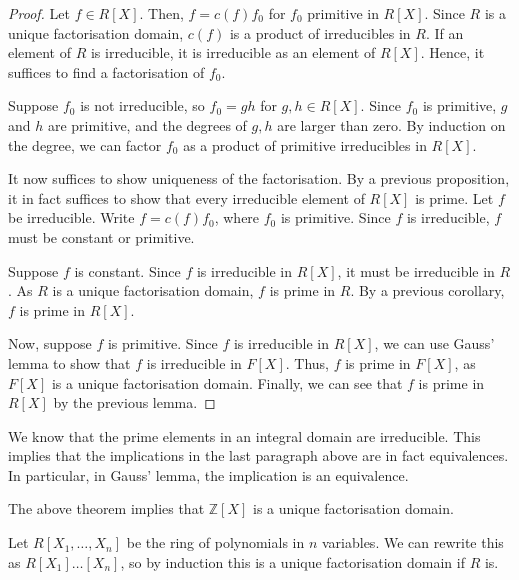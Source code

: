 \begin{proof}
	Let $f \in R[X]$.
	Then, $f = c(f) f_0$ for $f_0$ primitive in $R[X]$.
	Since $R$ is a unique factorisation domain, $c(f)$ is a product of irreducibles in $R$.
	If an element of $R$ is irreducible, it is irreducible as an element of $R[X]$.
	Hence, it suffices to find a factorisation of $f_0$.

	Suppose $f_0$ is not irreducible, so $f_0 = gh$ for $g,h \in R[X]$.
	Since $f_0$ is primitive, $g$ and $h$ are primitive, and the degrees of $g, h$ are larger than zero.
	By induction on the degree, we can factor $f_0$ as a product of primitive irreducibles in $R[X]$.

	It now suffices to show uniqueness of the factorisation.
	By a previous proposition, it in fact suffices to show that every irreducible element of $R[X]$ is prime.
	Let $f$ be irreducible.
	Write $f = c(f) f_0$, where $f_0$ is primitive.
	Since $f$ is irreducible, $f$ must be constant or primitive.

	Suppose $f$ is constant.
	Since $f$ is irreducible in $R[X]$, it must be irreducible in $R$.
	As $R$ is a unique factorisation domain, $f$ is prime in $R$.
	By a previous corollary, $f$ is prime in $R[X]$.

	Now, suppose $f$ is primitive.
	Since $f$ is irreducible in $R[X]$, we can use Gauss' lemma to show that $f$ is irreducible in $F[X]$.
	Thus, $f$ is prime in $F[X]$, as $F[X]$ is a unique factorisation domain.
	Finally, we can see that $f$ is prime in $R[X]$ by the previous lemma.
\end{proof}
\begin{remark}
	We know that the prime elements in an integral domain are irreducible.
	This implies that the implications in the last paragraph above are in fact equivalences.
	In particular, in Gauss' lemma, the implication is an equivalence.
\end{remark}
\begin{example}
	The above theorem implies that $\mathbb Z[X]$ is a unique factorisation domain.

	Let $R[X_1, \dots, X_n]$ be the ring of polynomials in $n$ variables.
	We can rewrite this as $R[X_1]\dots[X_n]$, so by induction this is a unique factorisation domain if $R$ is.
\end{example}

